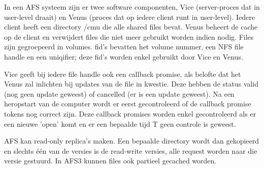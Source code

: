 \documentclass[../samenvatting.tex]{subfiles}
\begin{document}
In een AFS systeem zijn er twee software componenten, Vice (server-proces dat in user-level draait) en Venus (proces dat op iedere client runt in user-level). Iedere client heeft een directory /cmu die alle shared files bevat. Venus beheert de cache op de client en verwijdert files die niet meer gebruikt worden indien nodig. Files zijn gegroepeerd in volumes. fid's bevatten het volume nummer, een NFS file handle en een uniqifier; deze fid's worden enkel gebruikt door Vice en Venus.

Vice geeft bij iedere file handle ook een callback promise, als belofte dat het Venus zal inlichten bij updates van de file in kwestie. Deze hebben de status valid (nog geen update geweest) of cancelled (er is een update geweest). Na een heropstart van de computer wordt er eerst gecontroleerd of de callback promise tokens nog correct zijn. Deze callback promises worden enkel gecontroleerd als er een nieuwe 'open' komt en er een bepaalde tijd T geen controle is geweest. 

AFS kan read-only replica's maken. Een bepaalde directory wordt dan gekopieerd en slechts één van de versies is de read-write versies, alle request worden naar die versie gestuurd. In AFS3 kunnen files ook partieel gecached worden. 
\end{document}
